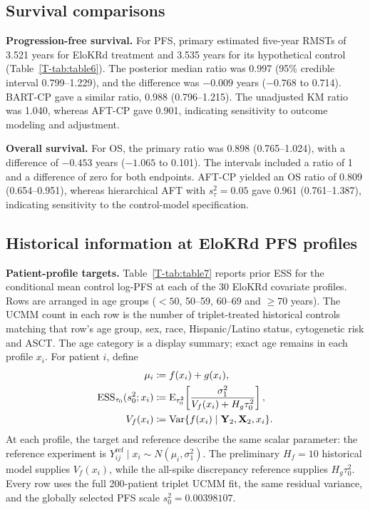 \documentclass[11pt]{article}
\begin{document}
\subsection{Survival comparisons}
\noindent\textbf{Progression-free survival.}
For PFS, primary \lrc{} estimated five-year RMSTs of 3.521 years for EloKRd treatment and 3.535 years for its hypothetical control (Table~\ref{T-tab:table6}). The posterior median ratio was 0.997 (95\% credible interval 0.799--1.229), and the difference was $-0.009$ years ($-0.768$ to 0.714). BART-CP gave a similar ratio, 0.988 (0.796--1.215). The unadjusted KM ratio was 1.040, whereas AFT-CP gave 0.901, indicating sensitivity to outcome modeling and adjustment.

\noindent\textbf{Overall survival.}
For OS, the primary \lrc{} ratio was 0.898 (0.765--1.024), with a difference of $-0.453$ years ($-1.065$ to 0.101). The \lrc{} intervals included a ratio of 1 and a difference of zero for both endpoints. AFT-CP yielded an OS ratio of 0.809 (0.654--0.951), whereas hierarchical AFT with $s_\tau^2=0.05$ gave 0.961 (0.761--1.387), indicating sensitivity to the control-model specification.

\subsection{Historical information at EloKRd PFS profiles}
\noindent\textbf{Patient-profile targets.}
Table~\ref{T-tab:table7} reports prior ESS for the conditional mean control log-PFS at each of the 30 EloKRd covariate profiles. Rows are arranged in age groups ($<50$, 50--59, 60--69 and $\geq70$ years). The UCMM count in each row is the number of triplet-treated historical controls matching that row's age group, sex, race, Hispanic/Latino status, cytogenetic risk and ASCT. The age category is a display summary; exact age remains in each profile $x_i$. For patient $i$, define
\begin{equation}\label{eq:profile}
\begin{aligned}
\mu_i&\coloneqq f(x_i)+g(x_i),\\
\operatorname{ESS}_{\tau_0}(s_0^2;x_i)&\coloneqq
\operatorname{E}_{\tau_0^2}\!\left[
\frac{\sigma_1^2}{V_f(x_i)+H_g\tau_0^2}
\right],\\
V_f(x_i)&\coloneqq
\operatorname{Var}\{f(x_i)\mid\mathbf Y_2,\mathbf X_2,x_i\}.
\end{aligned}
\end{equation}
At each profile, the target and reference describe the same scalar parameter: the reference experiment is $Y_{ij}^{\mathrm{ref}}\mid x_i\sim N(\mu_i,\sigma_1^2)$. The preliminary $H_f=10$ historical model supplies $V_f(x_i)$, while the all-spike discrepancy reference supplies $H_g\tau_0^2$. Every row uses the full 200-patient triplet UCMM fit, the same residual variance, and the globally selected PFS scale $s_0^2=0.00398107$.
\end{document}
